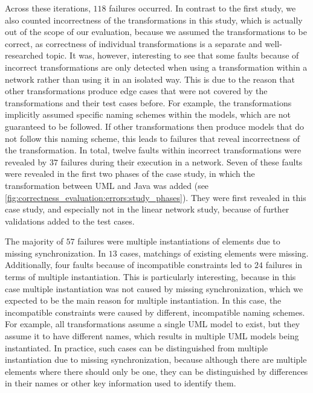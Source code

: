 Across these iterations, $118$ failures occurred.
In contrast to the first study, we also counted incorrectness of the transformations in this study, which is actually out of the scope of our evaluation, because we assumed the transformations to be correct, as correctness of individual transformations is a separate and well-researched topic.
It was, however, interesting to see that some faults because of incorrect transformations are only detected when using a transformation within a network rather than using it in an isolated way.
This is due to the reason that other transformations produce edge cases that were not covered by the transformations and their test cases before.
For example, the transformations implicitly assumed specific naming schemes within the models, which are not guaranteed to be followed.
If other transformations then produce models that do not follow this naming scheme, this leads to failures that reveal incorrectness of the transformation.
In total, twelve faults within incorrect transformations were revealed by $37$ failures during their execution in a network.
Seven of these faults were revealed in the first two phases of the case study, in which the transformation between \gls{UML} and Java was added (see \autoref{fig:correctness_evaluation:errors:study_phases}).
They were first revealed in this case study, and especially not in the linear network study, because of further validations added to the test cases.

The majority of $57$ failures were multiple instantiations of elements due to missing synchronization. In $13$ cases, matchings of existing elements were missing.
Additionally, four faults because of incompatible constraints led to $24$ failures in terms of multiple instantiation.
This is particularly interesting, because in this case multiple instantiation was not caused by missing synchronization, which we expected to be the main reason for multiple instantiation.
In this case, the incompatible constraints were caused by different, incompatible naming schemes.
For example, all transformations assume a single \gls{UML} model to exist, but they assume it to have different names, which results in multiple \gls{UML} models being instantiated.
In practice, such cases can be distinguished from multiple instantiation due to missing synchronization, because although there are multiple elements where there should only be one, they can be distinguished by differences in their names or other key information used to identify them.

